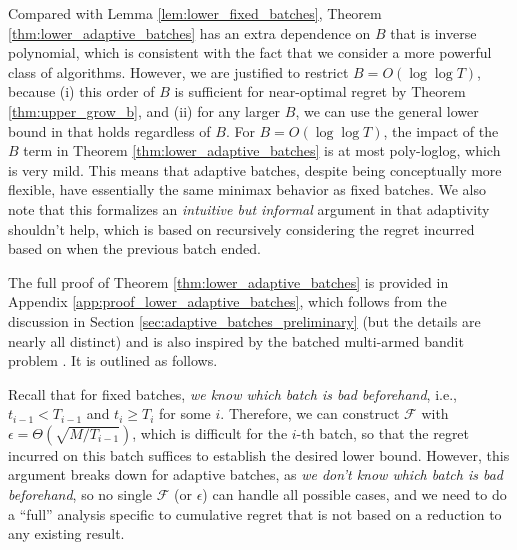 \documentclass[10pt]{article}
\begin{document}
\begin{remark} \label{rem:compare_lem}
    Compared with Lemma \ref{lem:lower_fixed_batches}, Theorem \ref{thm:lower_adaptive_batches} has an extra dependence on $B$ that is inverse polynomial, which is consistent with the fact that we consider a more powerful class of algorithms.
    However, we are justified to restrict $B=O(\log\log T)$,
    because (i) this order of $B$ is sufficient for near-optimal regret by Theorem \ref{thm:upper_grow_b}, and (ii) for any larger $B$, we can use the general lower bound in \citep{Scarlett17} that holds regardless of $B$.  
    For $B=O(\log\log T)$, the impact of the $B$ term in Theorem \ref{thm:lower_adaptive_batches} is at most poly-loglog, which is very mild. 
    This means that adaptive batches, despite being conceptually more flexible, have essentially the same minimax behavior as fixed batches.  We also note that this formalizes an \emph{intuitive but informal} argument in \citep{Li22} that adaptivity shouldn't help, which is based on recursively considering the regret incurred based on when the previous batch ended.
\end{remark}

The full proof of Theorem \ref{thm:lower_adaptive_batches} is provided in Appendix \ref{app:proof_lower_adaptive_batches}, which follows from the discussion in Section \ref{sec:adaptive_batches_preliminary} (but the details are nearly all distinct) and is also inspired by the batched multi-armed bandit problem \citep{Gao19}. It is outlined as follows.

Recall that for fixed batches, \emph{we know which batch is bad beforehand}, i.e., $t_{i-1}<T_{i-1} $ and $t_i\geq T_i$ for some $i$. Therefore, we can construct $\mathcal{F}$ with $\epsilon = \Theta(\sqrt{M/T_{i-1}})$, which is difficult for the $i$-th batch, so that the regret incurred on this batch suffices to establish the desired lower bound. 
However, this argument breaks down for adaptive batches, as \emph{we don't know which batch is bad beforehand}, so no single $\mathcal{F}$ (or $\epsilon$) can handle all possible cases, and we need to do a ``full'' analysis specific to cumulative regret that is not based on a reduction to any existing result.
\end{document}

